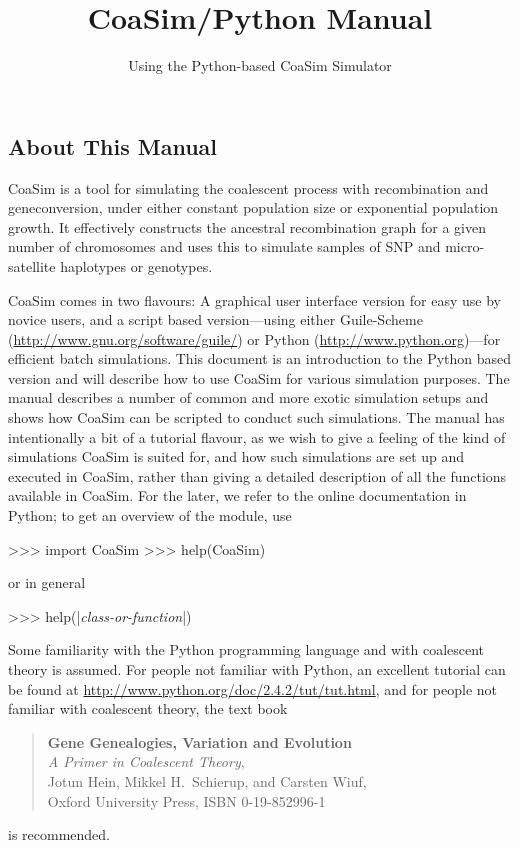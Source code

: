 \documentclass{manual}
\title{CoaSim/Python Manual}
\subtitle{Using the Python-based CoaSim Simulator}
\begin{document}
\begin{empfile}


\section{About This Manual}
\label{sec:about-this-manual}

CoaSim is a tool for simulating the coalescent process with
recombination and geneconversion, under either constant population
size or exponential population growth.  It effectively constructs the
ancestral recombination graph for a given number of chromosomes and
uses this to simulate samples of SNP and micro-satellite haplotypes or
genotypes.

CoaSim comes in two flavours: A graphical user interface version for
easy use by novice users, and a script based version---using either
Guile-Scheme (\url{http://www.gnu.org/software/guile/}) or Python
(\url{http://www.python.org})---for efficient batch simulations.  This
document is an introduction to the Python based version and will
describe how to use CoaSim for various simulation purposes.  The
manual describes a number of common and more exotic simulation setups
and shows how CoaSim can be scripted to conduct such simulations.  The
manual has intentionally a bit of a tutorial flavour, as we wish to
give a feeling of the kind of simulations CoaSim is suited for, and
how such simulations are set up and executed in CoaSim, rather than
giving a detailed description of all the functions available in
CoaSim.  For the later, we refer to the online documentation in
Python; to get an overview of the module, use
\begin{code}
>>> import CoaSim
>>> help(CoaSim)
\end{code}
or in general
\begin{code}
>>> help(|\emph{class-or-function}|)
\end{code}

Some familiarity with the Python programming language and with
coalescent theory is assumed.  For people not familiar with Python, an
excellent tutorial can be found at
\url{http://www.python.org/doc/2.4.2/tut/tut.html},
and for people not familiar with coalescent theory, the text book
\begin{quote}
  \textbf{Gene Genealogies, Variation and Evolution}\\
  \textit{A Primer in Coalescent Theory},\\
  Jotun Hein, Mikkel H.\ Schierup, and Carsten Wiuf,\\
  Oxford University Press, ISBN 0-19-852996-1  
\end{quote}
is recommended.


\end{empfile}
\end{document}
